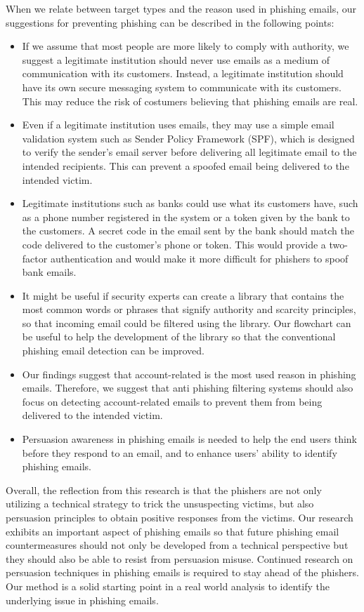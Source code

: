 When we relate between target types and the reason used in phishing
emails, our suggestions for preventing phishing can be described in
the following points:
\begin{itemize}
\item If we assume that most people are more likely to comply with authority,
we suggest a legitimate institution should never use emails as a medium
of communication with its customers. Instead, a legitimate institution
should have its own secure messaging system to communicate with its
customers. This may reduce the risk of costumers believing that phishing
emails are real.
\item Even if a legitimate institution uses emails, they may use a simple
email validation system such as Sender Policy Framework (SPF), which
is designed to verify the sender\textquoteright s email server before
delivering all legitimate email to the intended recipients. This can
prevent a spoofed email being delivered to the intended victim.
\item Legitimate institutions such as banks could use what its customers
have, such as a phone number registered in the system or a token given
by the bank to the customers. A secret code in the email sent by the
bank should match the code delivered to the customer\textquoteright s
phone or token. This would provide a two-factor authentication and
would make it more difficult for phishers to spoof bank emails.
\item It might be useful if security experts can create a library that contains
the most common words or phrases that signify authority and scarcity
principles, so that incoming email could be filtered using the library.
Our flowchart can be useful to help the development of the library
so that the conventional phishing email detection can be improved.
\item Our findings suggest that account-related is the most used reason
in phishing emails. Therefore, we suggest that anti phishing filtering
systems should also focus on detecting account-related emails to prevent
them from being delivered to the intended victim.
\item Persuasion awareness in phishing emails is needed to help the end
users think before they respond to an email, and to enhance users'
ability to identify phishing emails.
\end{itemize}
Overall, the reflection from this research is that the phishers are
not only utilizing a technical strategy to trick the unsuspecting
victims, but also persuasion principles to obtain positive responses
from the victims. Our research exhibits an important aspect of phishing
emails so that future phishing email countermeasures should not only
be developed from a technical perspective but they should also be
able to resist from persuasion misuse. Continued research on persuasion
techniques in phishing emails is required to stay ahead of the phishers.
Our method is a solid starting point in a real world analysis to identify
the underlying issue in phishing emails.


